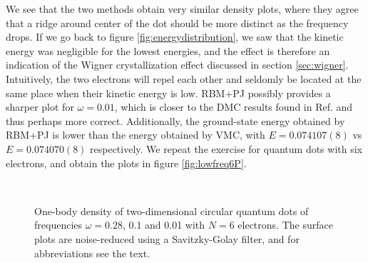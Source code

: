 We see that the two methods obtain very similar density plots, where they agree that a ridge around center of the dot should be more distinct as the frequency drops. If we go back to figure \eqref{fig:energydistribution}, we saw that the kinetic energy was negligible for the lowest energies, and the effect is therefore an indication of the Wigner crystallization effect discussed in section \ref{sec:wigner}. Intuitively, the two electrons will repel each other and seldomly be located at the same place when their kinetic energy is low. RBM+PJ possibly provides a sharper plot for $\omega=0.01$, which is closer to the DMC results found in Ref.\cite{hogberget_quantum_2013} and thus perhaps more correct. Additionally, the ground-state energy obtained by RBM+PJ is lower than the energy obtained by VMC, with $E=0.074107(8)$ vs $E=0.074070(8)$ respectively. We repeat the exercise for quantum dots with six electrons, and obtain the plots in figure \eqref{fig:lowfreq6P}.

\begin{figure}
	\centering
	\captionsetup[subfigure]{labelformat=empty}
	\hspace{0.1cm}
	\hspace{-0.cm}
	\hspace{-0.cm}
	\\ [-0.cm]
	
	\hspace{0.1cm}
	\hspace{-0.cm}
	\hspace{-0.cm}
	
	\caption{One-body density of two-dimensional circular quantum dots of frequencies $\omega=0.28$, 0.1 and 0.01 with $N=6$ electrons. The surface plots are noise-reduced using a Savitzky-Golay filter, and for abbreviations see the text.}
	\label{fig:lowfreq6P}
\end{figure}

